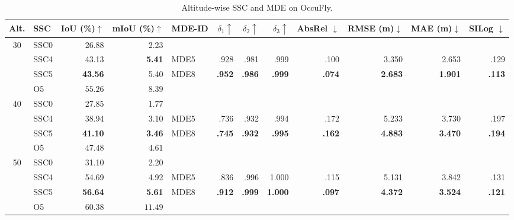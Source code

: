 \begin{table}[t]
\centering
\caption{Altitude-wise SSC and MDE on OccuFly.}
\label{tab:ssc-mde-altitude}
\scriptsize
\setlength{\tabcolsep}{0.55pt}
\renewcommand{\arraystretch}{1.05}
\begin{tabular}{@{}clrr@{\hspace{1.2pt}}|@{\hspace{1.2pt}}lrrrrrrr@{}}
\toprule
Alt. & SSC & \shortstack{IoU\\(\%)$\uparrow$} & \shortstack{mIoU\\(\%)$\uparrow$} & MDE-ID & $\delta_1\uparrow$ & $\delta_2\uparrow$ & $\delta_3\uparrow$ & \shortstack{AbsRel\\$\downarrow$} & \shortstack{RMSE\\(m)$\downarrow$} & \shortstack{MAE\\(m)$\downarrow$} & \shortstack{SILog\\$\downarrow$}\\
\midrule
30 & SSC0 & 26.88 & 2.23 & & & & & & & & \\
   & SSC4 & 43.13 & \textbf{5.41} & MDE5 & .928 & .981 & .999 & .100 & 3.350 & 2.653 & .129\\
   & SSC5 & \textbf{43.56} & 5.40 & MDE8 & \textbf{.952} & \textbf{.986} & \textbf{.999} & \textbf{.074} & \textbf{2.683} & \textbf{1.901} & \textbf{.113}\\
   & O5 & \cellcolor{yellow!35}$\mathbf{55.26}$ & \cellcolor{yellow!35}$\mathbf{8.39}$ & & & & & & & & \\
\midrule
40 & SSC0 & 27.85 & 1.77 & & & & & & & & \\
   & SSC4 & 38.94 & 3.10 & MDE5 & .736 & .932 & .994 & .172 & 5.233 & 3.730 & .197\\
   & SSC5 & \textbf{41.10} & \textbf{3.46} & MDE8 & \textbf{.745} & \textbf{.932} & \textbf{.995} & \textbf{.162} & \textbf{4.883} & \textbf{3.470} & \textbf{.194}\\
   & O5 & \cellcolor{yellow!35}$\mathbf{47.48}$ & \cellcolor{yellow!35}$\mathbf{4.61}$ & & & & & & & & \\
\midrule
50 & SSC0 & 31.10 & 2.20 & & & & & & & & \\
   & SSC4 & 54.69 & 4.92 & MDE5 & .836 & .996 & 1.000 & .115 & 5.131 & 3.842 & .131\\
   & SSC5 & \textbf{56.64} & \textbf{5.61} & MDE8 & \textbf{.912} & \textbf{.999} & \textbf{1.000} & \textbf{.097} & \textbf{4.372} & \textbf{3.524} & \textbf{.121}\\
   & O5 & \cellcolor{yellow!35}$\mathbf{60.38}$ & \cellcolor{yellow!35}$\mathbf{11.49}$ & & & & & & & & \\

\end{tabular}
\end{table}
